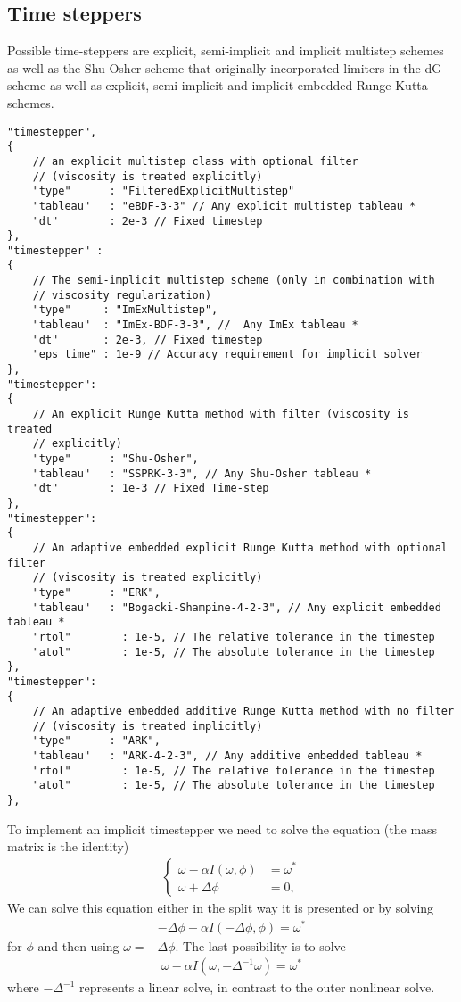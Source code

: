 \subsection{Time steppers}
Possible time-steppers are explicit, semi-implicit and implicit multistep schemes
as well as the Shu-Osher scheme that originally incorporated limiters in the dG scheme
as well as explicit, semi-implicit and implicit embedded Runge-Kutta schemes.
\begin{verbatim}
"timestepper",
{
    // an explicit multistep class with optional filter
    // (viscosity is treated explicitly)
    "type"      : "FilteredExplicitMultistep"
    "tableau"   : "eBDF-3-3" // Any explicit multistep tableau *
    "dt"        : 2e-3 // Fixed timestep
},
"timestepper" :
{
    // The semi-implicit multistep scheme (only in combination with
    // viscosity regularization)
    "type"     : "ImExMultistep",
    "tableau"  : "ImEx-BDF-3-3", //  Any ImEx tableau *
    "dt"       : 2e-3, // Fixed timestep
    "eps_time" : 1e-9 // Accuracy requirement for implicit solver
},
"timestepper":
{
    // An explicit Runge Kutta method with filter (viscosity is treated
    // explicitly)
    "type"      : "Shu-Osher",
    "tableau"   : "SSPRK-3-3", // Any Shu-Osher tableau *
    "dt"        : 1e-3 // Fixed Time-step
},
"timestepper":
{
    // An adaptive embedded explicit Runge Kutta method with optional filter
    // (viscosity is treated explicitly)
    "type"      : "ERK",
    "tableau"   : "Bogacki-Shampine-4-2-3", // Any explicit embedded tableau *
    "rtol"        : 1e-5, // The relative tolerance in the timestep
    "atol"        : 1e-5, // The absolute tolerance in the timestep
},
"timestepper":
{
    // An adaptive embedded additive Runge Kutta method with no filter
    // (viscosity is treated implicitly)
    "type"      : "ARK",
    "tableau"   : "ARK-4-2-3", // Any additive embedded tableau *
    "rtol"        : 1e-5, // The relative tolerance in the timestep
    "atol"        : 1e-5, // The absolute tolerance in the timestep
},
\end{verbatim}
To implement an implicit timestepper we need to solve the equation (the mass matrix is the identity)
\begin{align}\label{eq:split}
    \begin{cases}
        \omega - \alpha I(\omega, \phi) &= \omega^*  \\
        \omega+\Delta\phi &= 0,
    \end{cases}
\end{align}
We can solve this equation either in the split way it is presented or by solving
\begin{align} \label{eq:single}
    -\Delta\phi - \alpha I(-\Delta\phi, \phi) = \omega^*
\end{align}
for $\phi$ and then using $\omega = -\Delta\phi$.
The last possibility is to solve
\begin{align} \label{eq:omega}
    \omega - \alpha I ( \omega, -\Delta^{-1} \omega) = \omega^*
\end{align}
where $-\Delta^{-1}$ represents a linear solve, in contrast to the outer nonlinear solve.


